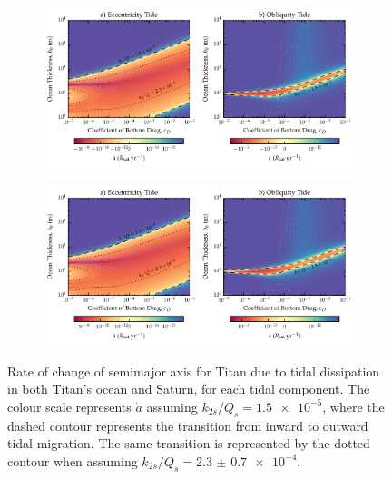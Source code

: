 \begin{figure}[!b]
    \centering
    \begin{subfigure}[t]{0.95\linewidth} %
        \includegraphics[width=\linewidth]{Figures/titan_adot}
        \label{fig:a_evo_ecc}
    \end{subfigure}
    \begin{subfigure}[t]{0\linewidth} %
         \includegraphics[width=\linewidth]{Figures/titan_adot}
         \label{fig:a_evo_obliq} 
    \end{subfigure}
    \vspace{-0.5cm}
\caption{Rate of change of semimajor axis for Titan due to tidal dissipation in both Titan's ocean and Saturn, for each tidal component. The colour scale represents $\dot{a}$ assuming $k_{2s}/Q_s = \num{1.5e-5}$, where the dashed contour represents the transition from inward to outward tidal migration. The same transition is represented by the dotted contour when assuming $k_{2s}/Q_s = \num[separate-uncertainty = true]{2.3(07)e-4}$.\label{fig:a_evo}}
\end{figure}


